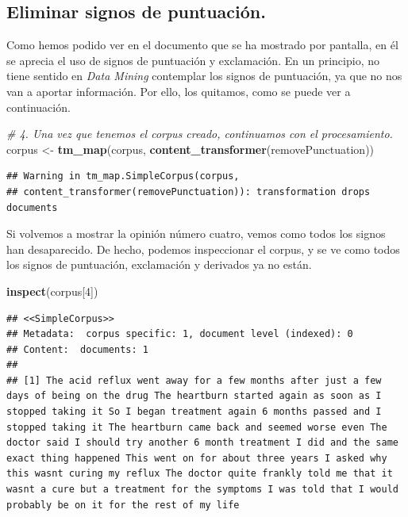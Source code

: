 \documentclass[spanish,]{article}
\newenvironment{Shaded}{\begin{snugshade}}{\end{snugshade}}
\newcommand{\KeywordTok}[1]{\textcolor[rgb]{0.13,0.29,0.53}{\textbf{#1}}}
\newcommand{\DecValTok}[1]{\textcolor[rgb]{0.00,0.00,0.81}{#1}}
\newcommand{\StringTok}[1]{\textcolor[rgb]{0.31,0.60,0.02}{#1}}
\newcommand{\CommentTok}[1]{\textcolor[rgb]{0.56,0.35,0.01}{\textit{#1}}}
\newcommand{\NormalTok}[1]{#1}
\begin{document}
\subsection{Eliminar signos de
puntuación.}\label{eliminar-signos-de-puntuacion.}

Como hemos podido ver en el documento que se ha mostrado por pantalla,
en él se aprecia el uso de signos de puntuación y exclamación. En un
principio, no tiene sentido en \textit{Data Mining} contemplar los
signos de puntuación, ya que no nos van a aportar información. Por ello,
los quitamos, como se puede ver a continuación.

\begin{Shaded}
\begin{Highlighting}[]
\CommentTok{# 4. Una vez que tenemos el corpus creado, continuamos con el procesamiento. }
\NormalTok{corpus <-}\StringTok{ }\KeywordTok{tm_map}\NormalTok{(corpus, }\KeywordTok{content_transformer}\NormalTok{(removePunctuation))}
\end{Highlighting}
\end{Shaded}

\begin{verbatim}
## Warning in tm_map.SimpleCorpus(corpus,
## content_transformer(removePunctuation)): transformation drops documents
\end{verbatim}

Si volvemos a mostrar la opinión número cuatro, vemos como todos los
signos han desaparecido. De hecho, podemos inspeccionar el corpus, y se
ve como todos los signos de puntuación, exclamación y derivados ya no
están.

\begin{Shaded}
\begin{Highlighting}[]
\KeywordTok{inspect}\NormalTok{(corpus[}\DecValTok{4}\NormalTok{])}
\end{Highlighting}
\end{Shaded}

\begin{verbatim}
## <<SimpleCorpus>>
## Metadata:  corpus specific: 1, document level (indexed): 0
## Content:  documents: 1
## 
## [1] The acid reflux went away for a few months after just a few days of being on the drug The heartburn started again as soon as I stopped taking it So I began treatment again 6 months passed and I stopped taking it The heartburn came back and seemed worse even The doctor said I should try another 6 month treatment I did and the same exact thing happened This went on for about three years I asked why this wasnt curing my reflux The doctor quite frankly told me that it wasnt a cure but a treatment for the symptoms I was told that I would probably be on it for the rest of my life
\end{verbatim}
\end{document}
